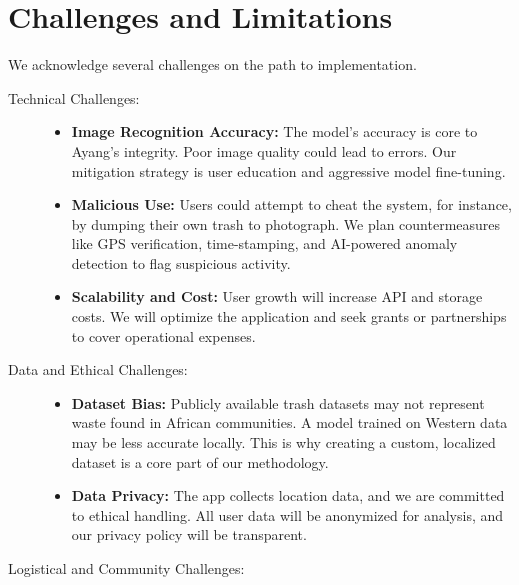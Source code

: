 \chapter[Challenges and Limitations]{Challenges and Limitations}
\label{cp:Challenges}

{
	\parindent0pt
	We acknowledge several challenges on the path to implementation.

	\begin{description}
		\item[Technical Challenges:]

		      \begin{itemize}
			      \item \textbf{Image Recognition Accuracy:} The model's accuracy is core to Ayang's integrity. Poor image quality could lead to errors. Our mitigation strategy is user education and aggressive model fine-tuning.
			  

			      \item \textbf{Malicious Use:} Users could attempt to cheat the system, for instance, by dumping their own trash to photograph. We plan countermeasures like GPS verification, time-stamping, and AI-powered anomaly detection to flag suspicious activity.

			      \item \textbf{Scalability and Cost:} User growth will increase API and storage costs. We will optimize the application and seek grants or partnerships to cover operational expenses.
		      \end{itemize}

		\item[Data and Ethical Challenges:]

		      \begin{itemize}
			      \item \textbf{Dataset Bias:} Publicly available trash datasets may not represent waste found in African communities. A model trained on Western data may be less accurate locally. This is why creating a custom, localized dataset is a core part of our methodology.

			      \item \textbf{Data Privacy:} The app collects location data, and we are committed to ethical handling. All user data will be anonymized for analysis, and our privacy policy will be transparent.
		      \end{itemize}

		\item[Logistical and Community Challenges:]


\end{description}}
